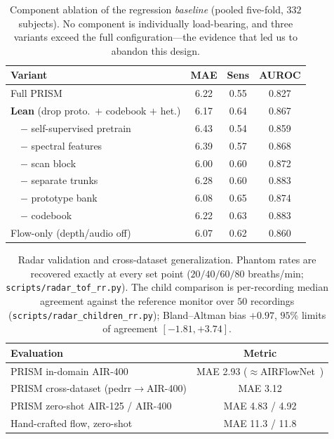 \documentclass[journal]{IEEEtran}
\begin{document}
\begin{table}[!t]\caption{Component ablation of the regression \emph{baseline} (pooled five-fold,
$332$ subjects). No component is individually load-bearing, and three variants exceed the full
configuration---the evidence that led us to abandon this design.}\label{tab:abl}
\centering\small
\setlength{\tabcolsep}{3pt}
\begin{tabular}{@{}lccc@{}}\toprule
Variant & MAE & Sens & AUROC\\\midrule
Full PRISM & 6.22 & 0.55 & 0.827\\
\textbf{Lean} (drop proto.\ $+$ codebook $+$ het.) & 6.17 & 0.64 & 0.867\\
\ \ $-$ self-supervised pretrain & 6.43 & 0.54 & 0.859\\
\ \ $-$ spectral features & 6.39 & 0.57 & 0.868\\
\ \ $-$ scan block & 6.00 & 0.60 & 0.872\\
\ \ $-$ separate trunks & 6.28 & 0.60 & 0.883\\
\ \ $-$ prototype bank & 6.08 & 0.65 & 0.874\\
\ \ $-$ codebook & 6.22 & 0.63 & 0.883\\
Flow-only (depth/audio off) & 6.07 & 0.62 & 0.860\\\bottomrule
\end{tabular}\end{table}

\begin{table}[!t]\caption{Radar validation and cross-dataset generalization. Phantom rates are
recovered exactly at every set point ($20/40/60/80$ breaths/min; \texttt{scripts/radar\_tof\_rr.py}).
The child comparison is per-recording median agreement against the reference monitor over $50$
recordings (\texttt{scripts/radar\_children\_rr.py}); Bland--Altman bias $+0.97$, $95\%$ limits of
agreement $[-1.81,+3.74]$.}\label{tab:crossdata}\centering\small
\begin{tabular}{@{}lc@{}}\toprule
Evaluation & Metric\\\midrule
PRISM in-domain AIR-400 & MAE 2.93 ($\approx$AIRFlowNet~\cite{infant_air})\\
PRISM cross-dataset (pedrr$\rightarrow$AIR-400) & MAE 3.12\\
PRISM zero-shot AIR-125 / AIR-400 & MAE 4.83 / 4.92\\
Hand-crafted flow, zero-shot & MAE 11.3 / 11.8\\\bottomrule
\end{tabular}\end{table}
\end{document}
